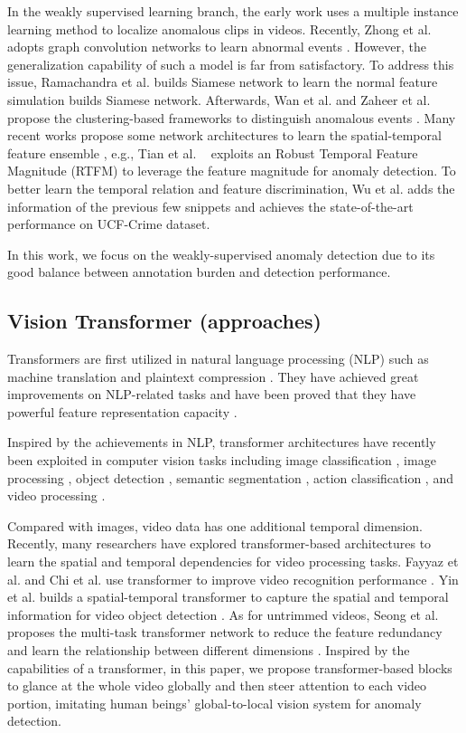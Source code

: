 \documentclass[letterpaper]{article} \usepackage{aaai23}  \usepackage{times}  \usepackage{helvet}  \usepackage{courier}  \usepackage[hyphens]{url}  \usepackage{graphicx} \urlstyle{rm} \def\UrlFont{\rm}  \usepackage{natbib}  \usepackage{caption} \frenchspacing  \setlength{\pdfpagewidth}{8.5in}  \setlength{\pdfpageheight}{11in}  \usepackage{algorithm}
\newcommand{\etal}{{et al. }}
\newcommand{\eg}{{e.g.}}
\begin{document}
In the weakly supervised learning branch, the early work \cite{RWAD} uses a multiple instance learning method to localize anomalous clips in videos. Recently, Zhong \etal adopts graph convolution networks to learn abnormal events \cite{GCLNC}. However, the generalization capability of such a model is far from satisfactory. To address this issue, Ramachandra \etal builds Siamese network to learn the normal feature simulation  builds Siamese network. Afterwards, Wan \etal and Zaheer \etal propose the clustering-based frameworks to distinguish anomalous events \cite{weakly-wsvad,claws}. Many recent works propose some network architectures to learn the spatial-temporal feature ensemble \cite{wsstad,MIST,RTFM,LCTR,MSL,IBL}, \eg, Tian \etal~\cite{RTFM} exploits an Robust Temporal Feature Magnitude (RTFM) to leverage the feature magnitude for anomaly detection. To better learn the temporal relation and feature discrimination, Wu \etal adds the information of the previous few snippets \cite{LCTR} and achieves the state-of-the-art performance on UCF-Crime dataset.

In this work, we focus on the weakly-supervised anomaly detection due to its good balance between annotation burden and detection performance.

\subsection{Vision Transformer (approaches)}
Transformers are first utilized in natural language processing (NLP) such as machine translation \cite{trans1} and plaintext compression \cite{trans2}. They have achieved great improvements on NLP-related tasks and have been proved that they have powerful feature representation capacity \cite{trans-survey}.

Inspired by the achievements in NLP, transformer architectures have recently been exploited in computer vision tasks including image classification \cite{ffn}, image processing \cite{vt-1}, object detection \cite{vt-2}, semantic segmentation \cite{vt-3}, action classification \cite{vt-4}, and video processing \cite{vt-5}.

Compared with images, video data has one additional temporal dimension. Recently, many researchers have explored transformer-based architectures to learn the spatial and temporal dependencies for video processing tasks. Fayyaz \etal and Chi \etal use transformer to improve video recognition performance \cite{trans-vi1,trans-vi2}. Yin \etal builds a spatial-temporal transformer to capture the spatial and temporal information for video object detection \cite{trans-vi3}. As for untrimmed videos, Seong \etal proposes the multi-task transformer network to reduce the feature redundancy and learn the relationship between different dimensions \cite{trans-vi4}. Inspired by the capabilities of a transformer, in this paper, we propose transformer-based blocks to glance at the whole video globally and then steer attention to each video portion, imitating human beings' global-to-local vision system for anomaly detection.
\end{document}
